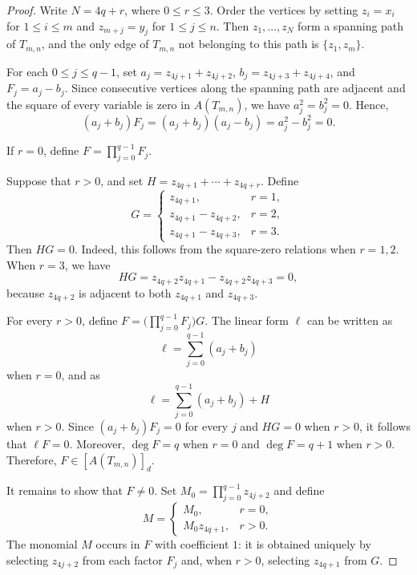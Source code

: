 \documentclass[12pt,twoside]{amsart}
\theoremstyle{definition}
\theoremstyle{mystyle}
\begin{document}
\begin{proof}
Write $N=4q+r$, where $0\leq r\leq3$. Order the vertices by setting
$z_i=x_i$ for $1\leq i\leq m$ and $z_{m+j}=y_j$ for
$1\leq j\leq n$. Then $z_1,\ldots,z_N$ form a spanning path of
$T_{m,n}$, and the only edge of $T_{m,n}$ not belonging to this path
is $\{z_1,z_m\}$.

For each $0\leq j\leq q-1$, set
$a_j=z_{4j+1}+z_{4j+2}$,
$b_j=z_{4j+3}+z_{4j+4}$, and $F_j=a_j-b_j$.
Since consecutive vertices along the spanning path are adjacent and
the square of every variable is zero in $A(T_{m,n})$, we have
$a_j^2=b_j^2=0$. Hence,
\begin{equation*}
(a_j+b_j)F_j=(a_j+b_j)(a_j-b_j)=a_j^2-b_j^2=0.
\end{equation*}

If $r=0$, define
$F=\prod_{j=0}^{q-1}F_j$.

Suppose that $r>0$, and set
$H=z_{4q+1}+\cdots+z_{4q+r}$. Define
\begin{equation*}
G=
\begin{cases}
z_{4q+1},&r=1,\\
z_{4q+1}-z_{4q+2},&r=2,\\
z_{4q+1}-z_{4q+3},&r=3.
\end{cases}
\end{equation*}
Then $HG=0$. Indeed, this follows from the square-zero relations when
$r=1,2$. When $r=3$, we have
\begin{equation*}
HG
=z_{4q+2}z_{4q+1}-z_{4q+2}z_{4q+3}
=0,
\end{equation*}
because $z_{4q+2}$ is adjacent to both $z_{4q+1}$ and $z_{4q+3}$.

For every $r>0$, define
$F=\bigl(\prod_{j=0}^{q-1}F_j\bigr)G$.
The linear form $\ell$ can be written as
$$\ell=\sum_{j=0}^{q-1}(a_j+b_j)$$ when $r=0$, and as
$$\ell=\sum_{j=0}^{q-1}(a_j+b_j)+H$$ when $r>0$. Since
$(a_j+b_j)F_j=0$ for every $j$ and $HG=0$ when $r>0$, it follows that
$\ell F=0$. Moreover, $\deg F=q$ when $r=0$ and $\deg F=q+1$ when
$r>0$. Therefore, $F\in[A(T_{m,n})]_d$.

It remains to show that $F\neq0$. Set
$M_0=\prod_{j=0}^{q-1}z_{4j+2}$ and define
\begin{equation*}
M=
\begin{cases}
M_0,&r=0,\\
M_0z_{4q+1},&r>0.
\end{cases}
\end{equation*}
The monomial $M$ occurs in $F$ with coefficient $1$: it is obtained
uniquely by selecting $z_{4j+2}$ from each factor $F_j$ and, when
$r>0$, selecting $z_{4q+1}$ from $G$.


\end{proof}
\end{document}
